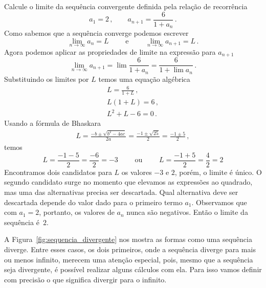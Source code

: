 \begin{example}
  Calcule o limite da sequência convergente definida pela relação de recorrência
  \[
    a_1 = 2  \,,
    \qquad
    a_{n+1} = \frac{6}{1+a_n}  \,.
  \]
\solution
  Como sabemos que a sequência converge podemos escrever
  \[
    \lim_{n\to\infty} a_n     = L \qquad \text{ e } \qquad
    \lim_{n\to\infty} a_{n+1} = L \,.
  \]
  Agora podemos aplicar as propriedades de limite na expressão para $a_{n+1}$
  \[
    \lim_{n\to\infty} a_{n+1} =
    \lim \frac{6}{1+a_n}  =
    \frac{6}{1+\lim a_n}  \,.
  \]
  Substituindo os limites por $L$ temos uma equação algébrica
  \begin{gather*}
  	L = \frac{6}{1+L} \,, \\[2mm]
  	L(1+L) = 6        \,, \\[2mm]
  	L^2 + L - 6  = 0  \,.
  \end{gather*}
  Usando a fórmula de Bhaskara
  \begin{gather*}
    L = \frac{-b\pm\sqrt{b^2 - 4ac}}{2a}
      = \frac{-1\pm\sqrt{25}}{2}
      = \frac{-1\pm 5}{2}  \,,
  \end{gather*}
  temos
  \[
    L = \frac{-1-5}{2} = \frac{-6}{2} = -3
    \qquad\text{ ou }\qquad
    L = \frac{-1+5}{2} = \frac{4}{2} = 2
  \]
  Encontramos dois candidatos para $L$ os valores $-3$ e $2$,
  porém, o limite é único. O segundo candidato surge no momento
  que elevamos as expressões ao quadrado, mas uma das alternativas
  precisa ser descartada. Qual alternativa deve ser descartada depende do
  valor dado para o primeiro termo $a_1$. Observamos que
  com $a_1=2$, portanto, os valores de $a_n$
  nunca são negativos. Então o limite da sequência é~$2$.
\end{example}

A Figura~\ref{fig:sequencia_divergente} nos mostra as formas como uma sequência
diverge. Entre esses casos, os dois primeiros, onde a sequência diverge para
mais ou menos infinito, merecem uma atenção especial, pois, mesmo que a
sequência seja divergente, é possível realizar alguns cálculos com ela.
Para isso vamos definir com precisão o que significa divergir para o infinito.

